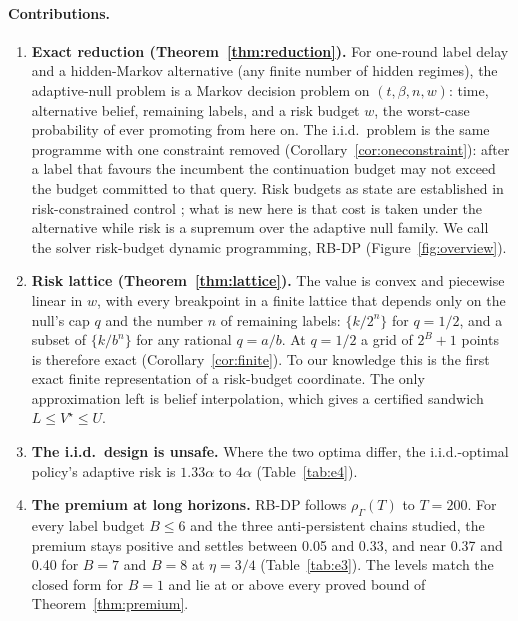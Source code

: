 \documentclass{article}
\theoremstyle{plain}
\theoremstyle{definition}
\theoremstyle{remark}
\newcommand{\rhoG}{\rho_\Gamma}
\begin{document}
\paragraph{Contributions.}
\begin{enumerate}[leftmargin=*,itemsep=1pt,topsep=2pt]
\item \textbf{Exact reduction (Theorem~\ref{thm:reduction}).} For one-round label delay and a hidden-Markov alternative (any finite number of hidden regimes), the adaptive-null problem is a Markov decision problem on $(t,\beta,n,w)$: time, alternative belief, remaining labels, and a risk budget $w$, the worst-case probability of ever promoting from here on. The i.i.d.\ problem is the same programme with one constraint removed (Corollary~\ref{cor:oneconstraint}): after a label that favours the incumbent the continuation budget may not exceed the budget committed to that query. Risk budgets as state are established in risk-constrained control \citep{chow2013stochastic,ho2024recursively}; what is new here is that cost is taken under the alternative while risk is a supremum over the adaptive null family. We call the solver risk-budget dynamic programming, RB-DP (Figure~\ref{fig:overview}).
\item \textbf{Risk lattice (Theorem~\ref{thm:lattice}).} The value is convex and piecewise linear in $w$, with every breakpoint in a finite lattice that depends only on the null's cap $q$ and the number $n$ of remaining labels: $\{k/2^n\}$ for $q=1/2$, and a subset of $\{k/b^n\}$ for any rational $q=a/b$. At $q=1/2$ a grid of $2^B+1$ points is therefore exact (Corollary~\ref{cor:finite}). To our knowledge this is the first exact finite representation of a risk-budget coordinate. The only approximation left is belief interpolation, which gives a certified sandwich $L\le V^\star\le U$.
\item \textbf{The i.i.d.\ design is unsafe.} Where the two optima differ, the i.i.d.-optimal policy's adaptive risk is $1.33\alpha$ to $4\alpha$ (Table~\ref{tab:e4}).
\item \textbf{The premium at long horizons.} RB-DP follows $\rhoG(T)$ to $T=200$. For every label budget $B\le 6$ and the three anti-persistent chains studied, the premium stays positive and settles between 0.05 and 0.33, and near 0.37 and 0.40 for $B=7$ and $B=8$ at $\eta=3/4$ (Table~\ref{tab:e3}). The levels match the closed form for $B=1$ and lie at or above every proved bound of Theorem~\ref{thm:premium}.

\end{enumerate}
\end{document}
